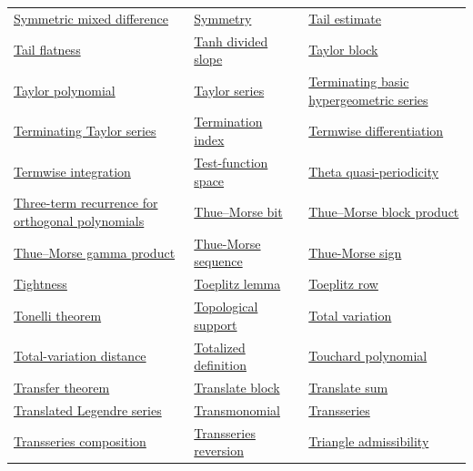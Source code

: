 \documentclass[11pt,oneside]{article}
\begin{document}
\begin{longtable}{L{0.31\textwidth}L{0.31\textwidth}L{0.31\textwidth}}
\hyperlink{gls:symmetric-mixed-difference}{Symmetric mixed difference} & \hyperlink{gls:symmetry}{Symmetry} & \hyperlink{gls:tail-estimate}{Tail estimate} \\
\hyperlink{gls:tail-flatness}{Tail flatness} & \hyperlink{gls:tanh-divided-slope}{Tanh divided slope} & \hyperlink{gls:taylor-block}{Taylor block} \\
\hyperlink{gls:taylor-polynomial}{Taylor polynomial} & \hyperlink{gls:taylor-series}{Taylor series} & \hyperlink{gls:terminating-basic-hypergeometric-series}{Terminating basic hypergeometric series} \\
\hyperlink{gls:terminating-taylor-series}{Terminating Taylor series} & \hyperlink{gls:q-series-termination-index}{Termination index} & \hyperlink{gls:termwise-differentiation}{Termwise differentiation} \\
\hyperlink{gls:termwise-integration}{Termwise integration} & \hyperlink{gls:test-function-space}{Test-function space} & \hyperlink{gls:theta-quasi-periodicity}{Theta quasi-periodicity} \\
\hyperlink{gls:three-term-recurrence}{Three-term recurrence for orthogonal polynomials} & \hyperlink{gls:thue-morse-bit}{Thue--Morse bit} & \hyperlink{gls:thue-morse-block-product}{Thue--Morse block product} \\
\hyperlink{gls:thue-morse-gamma-product}{Thue--Morse gamma product} & \hyperlink{gls:thue-morse-sequence}{Thue-Morse sequence} & \hyperlink{gls:thue-morse-sign}{Thue-Morse sign} \\
\hyperlink{gls:tightness}{Tightness} & \hyperlink{gls:toeplitz-lemma}{Toeplitz lemma} & \hyperlink{gls:toeplitz-row}{Toeplitz row} \\
\hyperlink{gls:tonelli-theorem}{Tonelli theorem} & \hyperlink{gls:topological-support}{Topological support} & \hyperlink{gls:total-variation}{Total variation} \\
\hyperlink{gls:total-variation-distance}{Total-variation distance} & \hyperlink{gls:totalized-definition}{Totalized definition} & \hyperlink{gls:touchard-polynomial}{Touchard polynomial} \\
\hyperlink{gls:transfer-theorem}{Transfer theorem} & \hyperlink{gls:translate-block}{Translate block} & \hyperlink{gls:translate-sum}{Translate sum} \\
\hyperlink{gls:translated-legendre-series}{Translated Legendre series} & \hyperlink{gls:transmonomial}{Transmonomial} & \hyperlink{gls:transseries}{Transseries} \\
\hyperlink{gls:transseries-composition}{Transseries composition} & \hyperlink{gls:transseries-reversion}{Transseries reversion} & \hyperlink{gls:triangle-admissibility}{Triangle admissibility} \\

\end{longtable}
\end{document}
